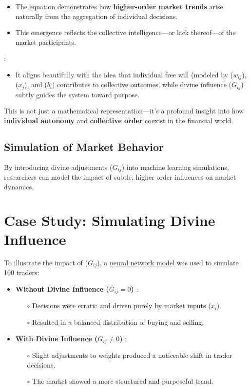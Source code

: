 \documentclass[a4]{article}
\newcommand{\bn}{\bigskip\noindent}
\begin{document}
\begin{itemize}
\item  The equation demonstrates how {\bf higher-order market trends}  arise naturally from the aggregation of individual decisions.  
\item This emergence reflects the collective intelligence---or lack thereof---of the market participants.
\end{itemize}

 
\bn  {\bf Theological Alignment} : 

\begin{itemize}
\item  It aligns beautifully with the idea that individual free will (modeled by ($w_{ij}$), ($x_j$), and ($b_i$) contributes to collective outcomes, while divine influence ($G_{ij}$) subtly guides the system toward purpose.
\end{itemize}

This is not just a mathematical representation---it's a profound insight into how {\bf individual autonomy}  and {\bf collective order}  coexist in the financial world.

\subsection{Simulation of Market Behavior}
By introducing divine adjustments ($G_{ij}$) into machine learning simulations, researchers can model the impact of subtle, higher-order influences on market dynamics.


\section{Case Study: Simulating Divine Influence}

To illustrate the impact of ($G_{ij}$), a \href{https://blog.quantiota.ai/page/6/divine-influence-in-financial-markets-a-neural-network-analogy-of-human-decision-making/}{neural network model}  was used to simulate 100 traders:

\begin{itemize}
\item  {\bf Without Divine Influence ($G_{ij} = 0$)} :
\begin{itemize}
\item[$\circ$]  Decisions were erratic and driven purely by market inputs ($x_i$).
\item [$\circ$]  Resulted in a balanced distribution of buying and selling.
\end{itemize}
\item {\bf With Divine Influence ($G_{ij} \neq 0$)} :
\begin{itemize}
\item[$\circ$]  Slight adjustments to weights produced a noticeable shift in trader decisions.
\item[$\circ$] The market showed a more structured and purposeful trend.
\end{itemize}
\end{itemize}
\end{document}
